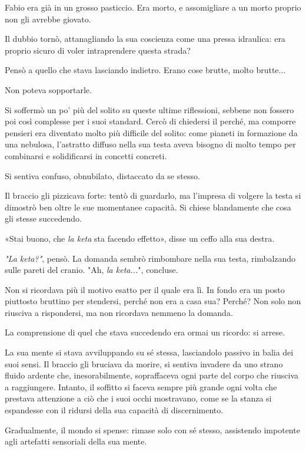 Fabio era già in un grosso pasticcio. Era morto, e assomigliare a un morto proprio non gli avrebbe giovato.

Il dubbio tornò, attanagliando la sua coscienza come una pressa idraulica: era proprio sicuro di voler intraprendere questa strada?

Pensò a quello che stava lasciando indietro. Erano cose brutte, molto brutte...

Non poteva sopportarle.

Si soffermò un po' più del solito su queste ultime riflessioni, sebbene non fossero poi così complesse per i suoi standard. Cercò di chiedersi il perché, ma comporre pensieri era diventato molto più difficile del solito: come pianeti in formazione da una nebulosa, l'astratto diffuso nella sua testa aveva bisogno di molto tempo per combinarsi e solidificarsi in concetti concreti.

Si sentiva confuso, obnubilato, distaccato da se stesso.

Il braccio gli pizzicava forte: tentò di guardarlo, ma l'impresa di volgere la testa si dimostrò ben oltre le sue momentanee capacità. Si chiese blandamente che cosa gli stesse succedendo.

«Stai buono, che \emph{la keta} sta facendo effetto», disse un ceffo alla sua destra.

\emph{"La keta?"}, pensò. La domanda sembrò rimbombare nella sua testa, rimbalzando sulle pareti del cranio. "Ah, \emph{la keta...}", concluse.

Non si ricordava più il motivo esatto per il quale era lì. In fondo era un posto piuttosto bruttino per stendersi, perché non era a casa sua? Perché? Non solo non riusciva a rispondersi, ma non ricordava nemmeno la domanda.

La comprensione di quel che stava succedendo era ormai un ricordo: si arrese.

La sua mente si stava avviluppando su sé stessa, lasciandolo passivo in balia dei suoi sensi. Il braccio gli bruciava da morire, si sentiva invadere da uno strano fluido ardente che, inesorabilmente, sopraffaceva ogni parte del corpo che riusciva a raggiungere. Intanto, il soffitto si faceva sempre più grande ogni volta che prestava attenzione a ciò che i suoi occhi mostravano, come se la stanza si espandesse con il ridursi della sua capacità di discernimento.

Gradualmente, il mondo si spense: rimase solo con sé stesso, assistendo impotente agli artefatti sensoriali della sua mente.